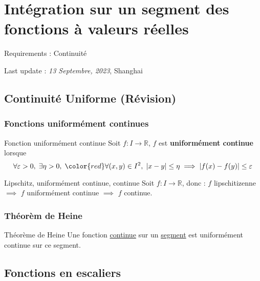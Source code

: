 \chapter{Intégration sur un segment des fonctions à valeurs réelles} %

\begin{tcolorbox}
Requirements : Continuité

Last update : \textit{13 Septembre, 2023}, Shanghai
\end{tcolorbox}

\section{Continuité Uniforme (Révision)} %
\label{sec:Continuité Uniforme (Révision)}

\subsection{Fonctions uniformément continues} %
\label{sub:Fonctions uniformément continues}
\begin{Definition}[colbacktitle=red!75!black]{Fonction uniformément continue}{}
Soit $f:I \to \mathbb{R}$, $f$ est \textbf{uniformément continue} lorsque 
\begin{equation}
  \forall \varepsilon>0, \; \exists \eta >0,\; {\color{red} \forall} (x, y) \in I ^{2}, \;| x- y| \le \eta  \implies |f(x) - f(y)| \le \varepsilon
\end{equation}
\end{Definition}

\begin{Prop}{Lipschitz, uniformément continue, continue}{}
Soit $f : I \to \mathbb{R}$, donc : $f$ lipschitizenne $\implies$ $f$ uniformément continue $\implies$ $f$ continue.
\end{Prop}

\subsection{Théorèm de Heine} %
\label{sub:}

\label{Thm: Heine}
\begin{Theorem}{Théorème de Heine}{}
Une fonction \underline{continue} sur un \underline{segment} est uniformément continue sur ce segment.
\end{Theorem}

\section{Fonctions en escaliers} %
\label{sec:Fonctions en escaliers}


